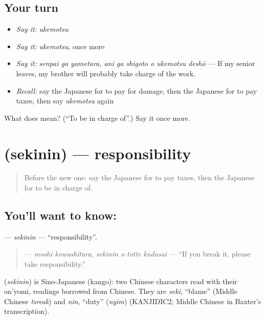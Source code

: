 \subsection*{Your turn}
\begin{itemize}
\raggedright
  \item \emph{Say it:} \emph{ukemotsu}
  \item \emph{Say it:} \emph{ukemotsu}, once more
  \item \emph{Say it:} \emph{senpai ga yametara, ani ga shigoto o ukemotsu deshō} — If my senior leaves, my brother will probably take charge of the work.
  \item \emph{Recall:} say the Japanese for to pay for damage, then the Japanese for to pay taxes, then say \emph{ukemotsu} again
\end{itemize}

\begin{tcolorbox}[breakable,colback=teal!4,colframe=teal!35!black,title={Before you move on}]
What does  mean? (\textquotedblleft{}To be in charge of\textquotedblright{}.) Say it once more.
\end{tcolorbox}
\section[\texorpdfstring{\ja{せきにん} (sekinin)}{せきにん (sekinin)}]{ (sekinin) — responsibility}

\label{lesson:JA-C364-sekinin}



\begin{quote}
Before the new one: say the Japanese for to pay taxes, then the Japanese for to be in charge of.
\end{quote}

\subsection*{You'll want to know: }
\textbf{} — \emph{sekinin} — \textquotedblleft{}responsibility\textquotedblright{}.

\begin{quote}
\textbf{   } — \emph{moshi kowashitara, sekinin o totte kudasai} — \textquotedblleft{}If you break it, please take responsibility.\textquotedblright{}
\end{quote}

\begin{cousinweb}
\textbf{} (\emph{sekinin}) is Sino-Japanese (kango): two Chinese characters read with their on'yomi, readings borrowed from Chinese. They are \emph{seki}, \textquotedblleft{}blame\textquotedblright{} (Middle Chinese \emph{tsreak}) and \emph{nin}, \textquotedblleft{}duty\textquotedblright{} (\emph{nyim}) (KANJIDIC2; Middle Chinese in Baxter's transcription).
\end{cousinweb}

